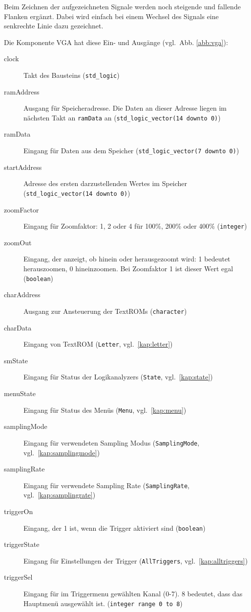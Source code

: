 \documentclass[IN,ngerman,utf8,12pt]{tumbook}
\newcommand{\vgl}{vgl.\ }
\begin{document}
Beim Zeichnen der aufgezeichneten Signale werden noch steigende und fallende Flanken ergänzt.
Dabei wird einfach bei einem Wechsel des Signals eine senkrechte Linie dazu gezeichnet.

Die Komponente VGA hat diese Ein- und Ausgänge (\vgl Abb. \ref{abb:vga}):
\begin{description}
    \item[clock] Takt des Bausteins (\texttt{std\_logic})
    \item[ramAddress] Ausgang für Speicheradresse. Die Daten an dieser Adresse liegen im nächsten Takt an \texttt{ramData} an (\texttt{std\_logic\_vector(14 downto 0)})
    \item[ramData] Eingang für Daten aus dem Speicher (\texttt{std\_logic\_vector(7 downto 0)})
    \item[startAddress] Adresse des ersten darzustellenden Wertes im Speicher (\texttt{std\_logic\_vector(14 downto 0)})
    \item[zoomFactor] Eingang für Zoomfaktor: 1, 2 oder 4 für 100\%, 200\% oder 400\% (\texttt{integer})
    \item[zoomOut] Eingang, der anzeigt, ob hinein oder herausgezoomt wird: 1 bedeutet herauszoomen, 0 hineinzoomen.
        Bei Zoomfaktor 1 ist dieser Wert egal (\texttt{boolean})
    \item[charAddress] Ausgang zur Ansteuerung der TextROMs (\texttt{character})
    \item[charData] Eingang von TextROM (\texttt{Letter}, \vgl \ref{kap:letter})
    \item[smState] Eingang für Status der Logikanalyzers (\texttt{State}, \vgl \ref{kap:state})
    \item[menuState] Eingang für Status des Menüs (\texttt{Menu}, \vgl \ref{kap:menu})
    \item[samplingMode] Eingang für verwendeten Sampling Modus (\texttt{SamplingMode}, \vgl \ref{kap:samplingmode})
    \item[samplingRate] Eingang für verwendete Sampling Rate (\texttt{SamplingRate}, \vgl \ref{kap:samplingrate})
    \item[triggerOn] Eingang, der 1 ist, wenn die Trigger aktiviert sind (\texttt{boolean})
    \item[triggerState] Eingang für Einstellungen der Trigger (\texttt{AllTriggers}, \vgl \ref{kap:alltriggers})
    \item[triggerSel] Eingang für im Triggermenu gewählten Kanal (0-7). 8 bedeutet, dass das Hauptmenü ausgewählt ist. (\texttt{integer range 0 to 8})

\end{description}
\end{document}
